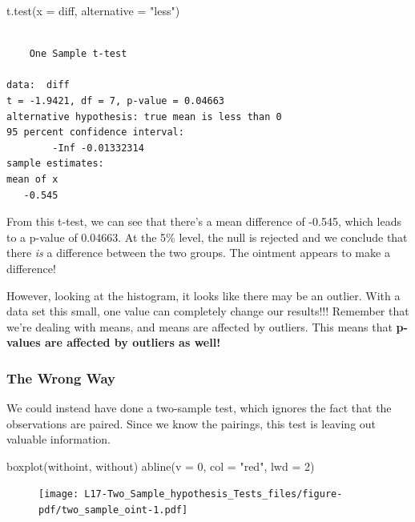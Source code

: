 \documentclass[
  letterpaper,
  DIV=11,
  numbers=noendperiod,
  oneside]{scrreprt}
\newenvironment{Shaded}{\begin{snugshade}}{\end{snugshade}}
\newcommand{\AttributeTok}[1]{\textcolor[rgb]{0.40,0.45,0.13}{#1}}
\newcommand{\DecValTok}[1]{\textcolor[rgb]{0.68,0.00,0.00}{#1}}
\newcommand{\FunctionTok}[1]{\textcolor[rgb]{0.28,0.35,0.67}{#1}}
\newcommand{\NormalTok}[1]{\textcolor[rgb]{0.00,0.23,0.31}{#1}}
\newcommand{\StringTok}[1]{\textcolor[rgb]{0.13,0.47,0.30}{#1}}
\begin{document}
\begin{Shaded}
\begin{Highlighting}[]
\FunctionTok{t.test}\NormalTok{(}\AttributeTok{x =}\NormalTok{ diff, }\AttributeTok{alternative =} \StringTok{"less"}\NormalTok{)}
\end{Highlighting}
\end{Shaded}

\begin{verbatim}

    One Sample t-test

data:  diff
t = -1.9421, df = 7, p-value = 0.04663
alternative hypothesis: true mean is less than 0
95 percent confidence interval:
        -Inf -0.01332314
sample estimates:
mean of x 
   -0.545 
\end{verbatim}

From this t-test, we can see that there's a mean difference of -0.545,
which leads to a p-value of 0.04663. At the 5\% level, the null is
rejected and we conclude that there \emph{is} a difference between the
two groups. The ointment appears to make a difference!

However, looking at the histogram, it looks like there may be an
outlier. With a data set this small, one value can completely change our
results!!! Remember that we're dealing with means, and means are
affected by outliers. This means that \textbf{p-values are affected by
outliers as well!}

\hypertarget{the-wrong-way}{%
\subsubsection{The Wrong Way}\label{the-wrong-way}}

We could instead have done a two-sample test, which ignores the fact
that the observations are paired. Since we know the pairings, this test
is leaving out valuable information.

\begin{Shaded}
\begin{Highlighting}[]
\FunctionTok{boxplot}\NormalTok{(withoint, without)}
\FunctionTok{abline}\NormalTok{(}\AttributeTok{v =} \DecValTok{0}\NormalTok{, }\AttributeTok{col =} \StringTok{"red"}\NormalTok{, }\AttributeTok{lwd =} \DecValTok{2}\NormalTok{)}
\end{Highlighting}
\end{Shaded}

\begin{figure}[H]

{\centering \texttt{[image: L17-Two\_Sample\_hypothesis\_Tests\_files/figure-pdf/two\_sample\_oint-1.pdf]}

}

\end{figure}
\end{document}
